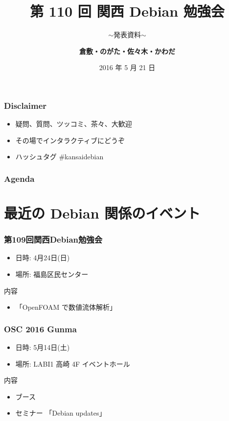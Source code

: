 \documentclass[cjk,dvipdfmx,10pt,compress,%
hyperref={bookmarks=true,bookmarksnumbered=true,bookmarksopen=false,%
colorlinks=false,%
pdftitle={第 109 回 関西 Debian 勉強会},%
pdfauthor={倉敷・のがた・佐々木・かわだ},%
pdfsubject={資料},%
}]{beamer}
\title{第 110 回 関西 Debian 勉強会}
\subtitle{$\sim$発表資料$\sim$}
\author[かわだ てつたろう]{{\large\bf 倉敷・のがた・佐々木・かわだ}}
\institute[Debian JP]{{\normalsize\tt 関西 Debian 勉強会}}
\date{{\small 2016 年 5 月 21 日}}
\begin{document}
\settitleslide
\begin{frame}
\titlepage
\end{frame}
\setdefaultslide

\begin{frame}[fragile]
  \frametitle{Disclaimer}
  \begin{itemize}
  \item 疑問、質問、ツッコミ、茶々、\alert{大歓迎}
  \item その場でインタラクティブにどうぞ
  \item ハッシュタグ \#kansaidebian
  \end{itemize}
\end{frame}

\begin{frame}[fragile]
\frametitle{Agenda}

\tableofcontents

\end{frame}

\section{最近の Debian 関係のイベント}

\begin{frame}[fragile]
  \frametitle{第109回関西Debian勉強会}
  \begin{itemize}
  \item 日時: 4月24日(日)
  \item 場所: 福島区民センター
  \end{itemize}
  \begin{block}{内容}
    \begin{itemize}
    \item 「OpenFOAM で数値流体解析」
    \end{itemize}
  \end{block}
\end{frame}

\begin{frame}[fragile]
  \frametitle{OSC 2016 Gunma}
  \begin{itemize}
  \item 日時: 5月14日(土)
  \item 場所: LABI1 高崎 4F イベントホール
  \end{itemize}
  \begin{block}{内容}
    \begin{itemize}
    \item ブース
    \item セミナー 「Debian updates」
    \end{itemize}
  \end{block}
\end{frame}
\end{document}
